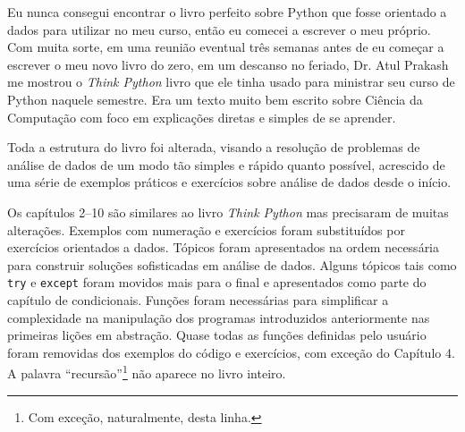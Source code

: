 Eu nunca consegui encontrar o livro perfeito sobre Python que fosse orientado a dados
para utilizar no meu curso, então eu comecei a escrever o meu próprio. Com
muita sorte, em uma reunião eventual três semanas antes de eu começar a
escrever o meu novo livro do zero, em um descanso no feriado, Dr. Atul Prakash
me mostrou o \emph{Think Python} livro que ele tinha usado para ministrar seu
curso de Python naquele semestre. Era um texto muito bem escrito sobre Ciência
da Computação com foco em explicações diretas e simples de se aprender.


Toda a estrutura do livro foi alterada, visando a resolução de problemas de
análise de dados de um modo tão simples e rápido quanto possível, acrescido
de uma série de exemplos práticos e exercícios sobre análise de dados desde
o início.


Os capítulos 2--10 são similares ao livro \emph{Think Python} mas precisaram
de muitas alterações. Exemplos com numeração e exercícios foram substituídos
por exercícios orientados a dados. Tópicos foram apresentados na ordem
necessária para construir soluções sofisticadas em análise de dados. Alguns
tópicos tais como {\tt try} e {\tt except} foram movidos mais para o final e
apresentados como parte do capítulo de condicionais. Funções foram necessárias
para simplificar a complexidade na manipulação dos programas introduzidos
anteriormente nas primeiras lições em abstração. Quase todas as funções
definidas pelo usuário foram removidas dos exemplos do código e exercícios,
com exceção do Capítulo 4. A palavra ``recursão''\footnote{Com exceção,
	naturalmente, desta linha.} não aparece no livro inteiro.


